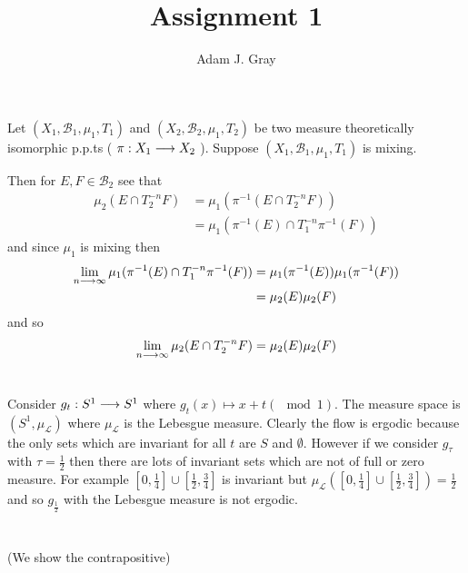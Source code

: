 \documentclass{unswmaths}
\begin{document}
\author{Adam J. Gray}
\title{Assignment 1}
\subject{Ergodic Theory}

\unswtitle

\section{}
Let $ (X_1, \mathcal{B}_1, \mu_1, T_1) $ and $(X_2, \mathcal{B}_2, \mu_1, T_2)$ be two measure theoretically isomorphic p.p.ts ( $ \pi : X_1 \longrightarrow X_2 $ ). Suppose $ (X_1, \mathcal{B}_1, \mu_1, T_1) $ is mixing.

Then for $ E, F \in \mathcal{B}_2 $ see that
\begin{align*}
    \mu_2(E \cap T_2^{-n}F) &= \mu_1( \pi^{-1}(E \cap T_2^{-n} F)) \\
        &= \mu_1( \pi^{-1}(E) \cap T_1^{-n} \pi^{-1}(F))
\end{align*}
and since $ \mu_1 $ is mixing then 
\begin{align*}
    \lim_{n\longrightarrow\infty} \mu_1( \pi^{-1}(E) \cap T_1^{-n} \pi^{-1}(F)) &= \mu_{1}(\pi^{-1}(E)) \mu_{1}(\pi^{-1}(F)) \\
        &= \mu_2(E)\mu_2(F)
\end{align*}
and so
\begin{align*}
    \lim_{n\longrightarrow\infty}\mu_2(E \cap T_2^{-n}F) = \mu_2(E)\mu_2(F)
\end{align*}

\section{}
Consider $ g_t : S^1 \longrightarrow S^1 $ where $ g_t(x) \mapsto x + t (\mod 1)$. The measure space is $ (S^{1}, \mu_{\mathcal{L}}) $ where $ \mu_{\mathcal{L}} $ is the Lebesgue measure. Clearly the flow is ergodic because the only sets which are invariant for all $ t $ are $ S $ and $ \emptyset $. However if we consider $ g_\tau $ with $ \tau = \frac{1}{2} $ then there are lots of invariant sets which are not of full or zero measure. For example $ [0, \frac{1}{4}] \cup [\frac{1}{2}, \frac{3}{4}] $ is invariant but $ \mu_{\mathcal{L}}(  [0, \frac{1}{4}] \cup [\frac{1}{2}, \frac{3}{4}]) = \frac{1}{2} $ and so $ g_\frac{1}{2} $ with the Lebesgue measure is not ergodic. 

\section{}
(We show the contrapositive)
\end{document}
